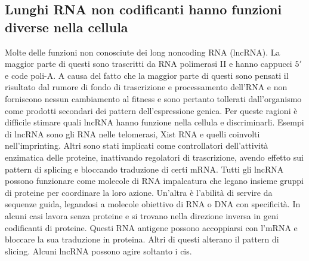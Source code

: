 \subsection{Lunghi RNA non codificanti hanno funzioni diverse nella cellula}
Molte delle funzioni non conosciute dei long noncoding RNA (lncRNA). La maggior parte di questi sono trascritti da RNA polimerasi II e hanno cappucci $5'$ e code poli-A. A causa del
fatto che la maggior parte di questi sono pensati il risultato dal rumore di fondo di trascrizione e processamento dell'RNA e non forniscono nessun cambiamento al fitness e sono pertanto
tollerati dall'organismo come prodotti secondari dei pattern dell'espressione genica. Per queste ragioni \`e difficile stimare quali lncRNA hanno funzione nella cellula e discriminarli. 
Esempi di lncRNA sono gli RNA nelle telomerasi, Xist RNA e quelli coinvolti nell'imprinting. Altri sono stati implicati come controllatori dell'attivit\`a enzimatica delle proteine, 
inattivando regolatori di trascrizione, avendo effetto sui pattern di splicing e bloccando traduzione di certi mRNA. Tutti gli lncRNA possono funzionare come molecole di RNA impalcatura
che legano insieme gruppi di proteine per coordinare la loro azione. Un'altra \`e l'abilit\`a di servire da sequenze guida, legandosi a molecole obiettivo di RNA o DNA con specificit\`a.
In alcuni casi lavora senza proteine e si trovano nella direzione inversa in geni codificanti di proteine. Questi RNA antigene possono accoppiarsi con l'mRNA e bloccare la sua traduzione
in proteina. Altri di questi alterano il pattern di slicing. Alcuni lncRNA possono agire soltanto i cis. 
